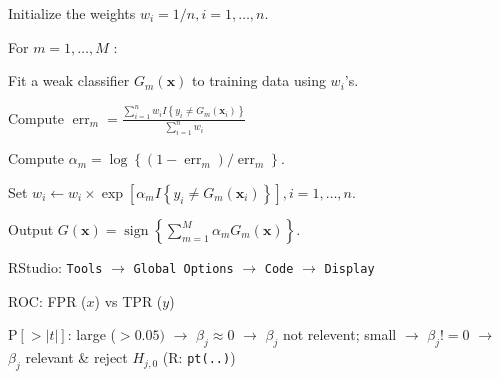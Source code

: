 \begin{sectionbox}[AdaBoost.M1]\nospacing{}

  \begin{enumeratenosep}[label=\roman*]
\item Initialize the weights $w_{i}=1 / n, i=1, \ldots, n$.
\item For $m=1, \ldots, M$ :
\begin{enumeratenosep}[label=\alph*)]
    \item Fit a weak classifier $G_{m}(\boldsymbol{x})$ to training data using $w_{i}$'s.
\item Compute
$
\operatorname{err}_{m}=\frac{\sum_{i=1}^{n} w_{i} I\left\{y_{i} \neq G_{m}\left(\boldsymbol{x}_{i}\right)\right\}}{\sum_{i=1}^{n} w_{i}}
$
\item Compute $\alpha_{m}=\log \left\{\left(1-\operatorname{err}_{m}\right) / \operatorname{err}_{m}\right\}$.
\item Set $w_{i} \leftarrow w_{i} \times \exp \left[\alpha_{m} I\left\{y_{i} \neq G_{m}\left(\boldsymbol{x}_{i}\right)\right\}\right], i=1, \ldots, n$.
\end{enumeratenosep}

\item Output $G(\boldsymbol{x})=\operatorname{sign}\left\{\sum_{m=1}^{M} \alpha_{m} G_{m}(\boldsymbol{x})\right\}$.
\end{enumeratenosep}
\end{sectionbox}
\begin{notebox}[Misc]\nospacing{}
  \begin{enumeratenosep}[label=\roman*]
    \item RStudio: \texttt{Tools} $\rightarrow$ \texttt{Global Options} $\rightarrow$ \texttt{Code} $\rightarrow$ \texttt{Display}
    \item ROC: FPR ($x$) vs TPR ($y$)
    \item $\text{P}[>|t|]$: large ($>0.05)$ $\rightarrow$ $\beta_j \approx 0$ $\rightarrow$ $\beta_j$ not relevent; small $\rightarrow$ $\beta_j!=0$ $\rightarrow$ $\beta_j$ relevant \& reject $H_{j,0}$ (R: \texttt{pt(..)})
  \end{enumeratenosep}
\end{notebox}

